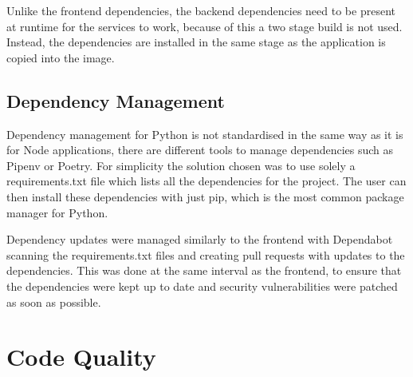 Unlike the frontend dependencies, the backend dependencies need to be present at runtime for the services to work, because of this a two stage build is not used. Instead, the dependencies are installed in the same stage as the application is copied into the image.

\subsection{Dependency Management}
Dependency management for Python is not standardised in the same way as it is for Node applications, there are different tools to manage dependencies such as Pipenv or Poetry. For simplicity the solution chosen was to use solely a requirements.txt file which lists all the dependencies for the project. The user can then install these dependencies with just pip, which is the most common package manager for Python.

Dependency updates were managed similarly to the frontend with Dependabot scanning the requirements.txt files and creating pull requests with updates to the dependencies. This was done at the same interval as the frontend, to ensure that the dependencies were kept up to date and security vulnerabilities were patched as soon as possible.

\section{Code Quality}~\label{sec:code-quality}
